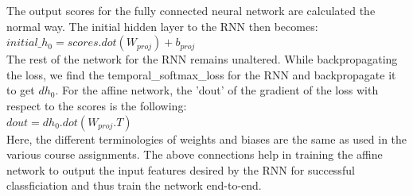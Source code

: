 \documentclass[10pt,twocolumn,letterpaper]{article}
\begin{document}
The output scores for the fully connected neural network are calculated the normal way. The initial hidden layer to the RNN then becomes:\\
$initial\_h_0=scores.dot(W_{proj})+b_{proj}$\\
The rest of the network for the RNN remains unaltered. While backpropagating the loss, we find the temporal\_softmax\_loss for the RNN and backpropagate it to get $dh_0$. For the affine network, the 'dout' of the gradient of the loss with respect to the scores is the following:\\
$dout= dh_0.dot(W_{proj}.T)$\\
Here, the different terminologies of weights and biases are the same as used in the various course assignments. The above connections help in training the affine network to output the input features desired by the RNN for successful classficiation and thus train the network end-to-end.
\end{document}
